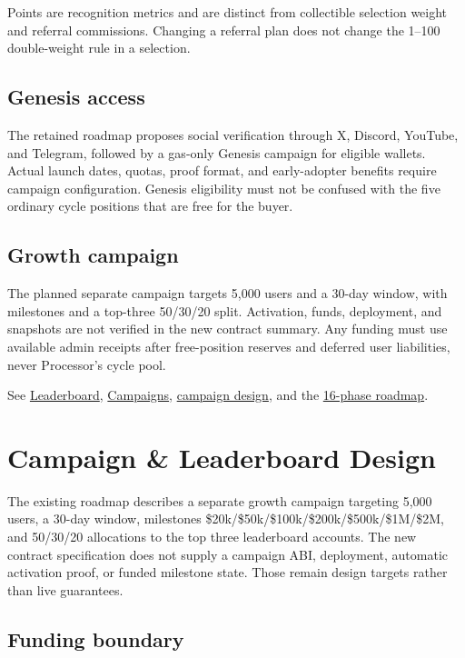 \documentclass[
  10pt,
  letterpaper,
]{article}
\begin{document}
Points are recognition metrics and are distinct from collectible
selection weight and referral commissions. Changing a referral plan does
not change the 1--100 double-weight rule in a selection.

\subsection{Genesis access}\label{genesis-access}

The retained roadmap proposes social verification through X, Discord,
YouTube, and Telegram, followed by a gas-only Genesis campaign for
eligible wallets. Actual launch dates, quotas, proof format, and
early-adopter benefits require campaign configuration. Genesis
eligibility must not be confused with the five ordinary cycle positions
that are free for the buyer.

\subsection{Growth campaign}\label{growth-campaign}

The planned separate campaign targets 5,000 users and a 30-day window,
with milestones and a top-three 50/30/20 split. Activation, funds,
deployment, and snapshots are not verified in the new contract summary.
Any funding must use available admin receipts after free-position
reserves and deferred user liabilities, never Processor's cycle pool.

See \href{https://fos.ooo/document/docs/leaderboard}{Leaderboard},
\href{https://fos.ooo/document/docs/campaigns}{Campaigns},
\href{https://fos.ooo/document/docs/technical/campaign-contract}{campaign
design}, and the \href{https://fos.ooo/document/docs/roadmap}{16-phase
roadmap}.

\section{Campaign \& Leaderboard
Design}\label{campaign-leaderboard-design}

The existing roadmap describes a separate growth campaign targeting
5,000 users, a 30-day window, milestones
\$20k/\$50k/\$100k/\$200k/\$500k/\$1M/\$2M, and 50/30/20 allocations to
the top three leaderboard accounts. The new contract specification does
not supply a campaign ABI, deployment, automatic activation proof, or
funded milestone state. Those remain design targets rather than live
guarantees.

\subsection{Funding boundary}\label{funding-boundary}
\end{document}

